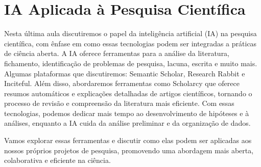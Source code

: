 \documentclass[
  a4paper,
]{article}
\begin{document}
\section{IA Aplicada à Pesquisa Científica}\label{sec-AI}

Nesta última aula discutiremos o papel da inteligência artificial (IA)
na pesquisa científica, com ênfase em como essas tecnologias podem ser
integradas a práticas de ciência aberta. A IA oferece ferramentas para a
análise da literatura, fichamento, identificação de problemas de
pesquisa, lacuna, escrita e muito mais. Algumas plataformas que
discutiremos: Semantic Scholar, Research Rabbit e Inciteful. Além disso,
abordaremos ferramentas como Scholarcy que oferece resumos automáticos e
explicações detalhadas de artigos científicos, tornando o processo de
revisão e compreensão da literatura mais eficiente. Com essas
tecnologias, podemos dedicar mais tempo ao desenvolvimento de hipóteses
e à análises, enquanto a IA cuida da análise preliminar e da organização
de dados.

Vamos explorar essas ferramentas e discutir como elas podem ser
aplicadas aos nossos próprios projetos de pesquisa, promovendo uma
abordagem mais aberta, colaborativa e eficiente na ciência.
\end{document}
